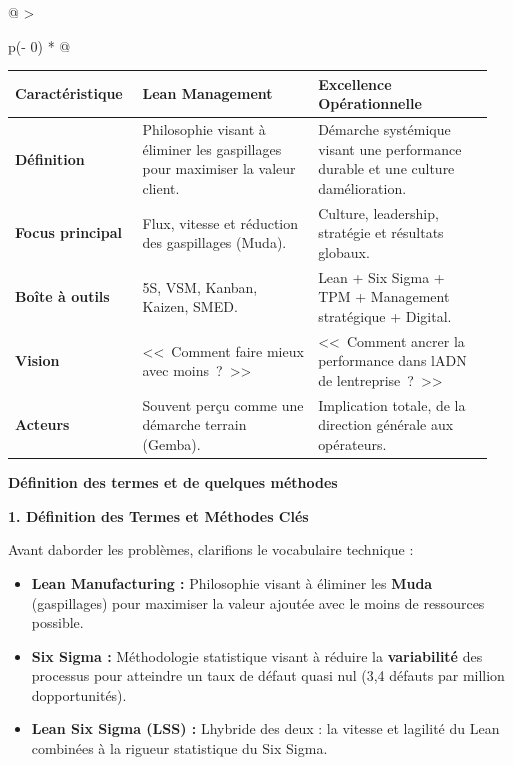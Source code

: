 \documentclass[
]{article}
\begin{document}
\begin{longtable}[]{@{}
  >{\raggedright\arraybackslash}p{(\columnwidth - 0\tabcolsep) * }@{}}
\begin{minipage}[b]{\linewidth}
\begin{tabular}{@{}
  >{\raggedright\arraybackslash}p{0.25\linewidth}
  >{\raggedright\arraybackslash}p{0.35\linewidth}
  >{\raggedright\arraybackslash}p{0.35\linewidth}@{}}
\toprule
\textbf{Caractéristique} & \textbf{Lean Management} & \textbf{Excellence Opérationnelle} \\
\midrule
\textbf{Définition} & Philosophie visant à éliminer les gaspillages pour maximiser la valeur client. & Démarche systémique visant une performance durable et une culture d\textquotesingle amélioration. \\
\midrule
\textbf{Focus principal} & Flux, vitesse et réduction des gaspillages (Muda). & Culture, leadership, stratégie et résultats globaux. \\
\midrule
\textbf{Boîte à outils} & 5S, VSM, Kanban, Kaizen, SMED. & Lean + Six Sigma + TPM + Management stratégique + Digital. \\
\midrule
\textbf{Vision} & <<~Comment faire mieux avec moins~?~>> & <<~Comment ancrer la performance dans l\textquotesingle ADN de l\textquotesingle entreprise~?~>> \\
\midrule
\textbf{Acteurs} & Souvent perçu comme une démarche terrain (Gemba). & Implication totale, de la direction générale aux opérateurs. \\
\bottomrule
\end{tabular}

\vspace{1em}

\textbf{Définition des termes et de quelques méthodes}

\textbf{1. Définition des Termes et Méthodes Clés}

Avant d\textquotesingle aborder les problèmes, clarifions le vocabulaire technique :

\begin{itemize}
\item \textbf{Lean Manufacturing :} Philosophie visant à éliminer les \textbf{Muda} (gaspillages) pour maximiser la valeur ajoutée avec le moins de ressources possible.
\item \textbf{Six Sigma :} Méthodologie statistique visant à réduire la \textbf{variabilité} des processus pour atteindre un taux de défaut quasi nul (3,4 défauts par million d\textquotesingle opportunités).
\item \textbf{Lean Six Sigma (LSS) :} L\textquotesingle hybride des deux : la vitesse et l\textquotesingle agilité du Lean combinées à la rigueur statistique du Six Sigma.
\end{itemize}

\end{minipage} \\
\midrule\noalign{}
\endhead
\bottomrule\noalign{}
\endlastfoot
\end{longtable}
\end{document}
